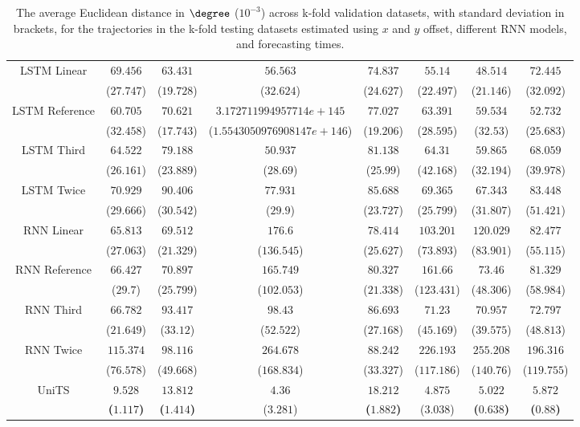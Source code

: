 \begin{table}[!ht]
{\begin{tabular}{|c|c|c|c|c|c|c|c|}
			\multirow{2}{*}{LSTM Linear} & $69.456$ & $63.431$ & $56.563$ & $74.837$ & $55.14$ & $48.514$ & $72.445$ \\
			 & ($27.747$) & ($19.728$) & ($32.624$) & ($24.627$) & ($22.497$) & ($21.146$) & ($32.092$) \\ \hline
			\multirow{2}{*}{LSTM Reference} & $60.705$ & $70.621$ & $3.172711994957714e+145$ & $77.027$ & $63.391$ & $59.534$ & $52.732$ \\
			 & ($32.458$) & ($17.743$) & ($1.5543050976908147e+146$) & ($19.206$) & ($28.595$) & ($32.53$) & ($25.683$) \\ \hline
			\multirow{2}{*}{LSTM Third} & $64.522$ & $79.188$ & $50.937$ & $81.138$ & $64.31$ & $59.865$ & $68.059$ \\
			 & ($26.161$) & ($23.889$) & ($28.69$) & ($25.99$) & ($42.168$) & ($32.194$) & ($39.978$) \\ \hline
			\multirow{2}{*}{LSTM Twice} & $70.929$ & $90.406$ & $77.931$ & $85.688$ & $69.365$ & $67.343$ & $83.448$ \\
			 & ($29.666$) & ($30.542$) & ($29.9$) & ($23.727$) & ($25.799$) & ($31.807$) & ($51.421$) \\ \hline
			\multirow{2}{*}{RNN Linear} & $65.813$ & $69.512$ & $176.6$ & $78.414$ & $103.201$ & $120.029$ & $82.477$ \\
			 & ($27.063$) & ($21.329$) & ($136.545$) & ($25.627$) & ($73.893$) & ($83.901$) & ($55.115$) \\ \hline
			\multirow{2}{*}{RNN Reference} & $66.427$ & $70.897$ & $165.749$ & $80.327$ & $161.66$ & $73.46$ & $81.329$ \\
			 & ($29.7$) & ($25.799$) & ($102.053$) & ($21.338$) & ($123.431$) & ($48.306$) & ($58.984$) \\ \hline
			\multirow{2}{*}{RNN Third} & $66.782$ & $93.417$ & $98.43$ & $86.693$ & $71.23$ & $70.957$ & $72.797$ \\
			 & ($21.649$) & ($33.12$) & ($52.522$) & ($27.168$) & ($45.169$) & ($39.575$) & ($48.813$) \\ \hline
			\multirow{2}{*}{RNN Twice} & $115.374$ & $98.116$ & $264.678$ & $88.242$ & $226.193$ & $255.208$ & $196.316$ \\
			 & ($76.578$) & ($49.668$) & ($168.834$) & ($33.327$) & ($117.186$) & ($140.76$) & ($119.755$) \\ \hline
			\multirow{2}{*}{UniTS} & $\mathbf{9.528}$ & $\mathbf{13.812}$ & $4.36$ & $\mathbf{18.212}$ & $4.875$ & $\mathbf{5.022}$ & $\mathbf{5.872}$ \\
			 & \textbf{(}$\mathbf{1.117}$\textbf{)} & \textbf{(}$\mathbf{1.414}$\textbf{)} & ($3.281$) & \textbf{(}$\mathbf{1.882}$\textbf{)} & ($3.038$) & \textbf{(}$\mathbf{0.638}$\textbf{)} & \textbf{(}$\mathbf{0.88}$\textbf{)} \\ \hline
		\end{tabular}
	}
	\caption{The average Euclidean distance in $\degree$ ($10^{-3}$) across k-fold validation datasets, with standard deviation in brackets, for the trajectories in the k-fold testing datasets estimated using $x$ and $y$ offset, different RNN models, and forecasting times.}
	\label{tab:all_no_abs_euclid}
\end{table}


